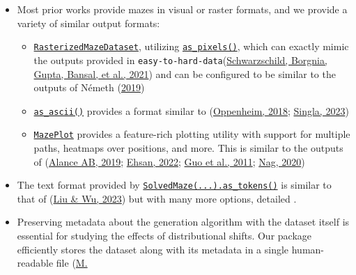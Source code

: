 \documentclass[10pt,a4paper,onecolumn]{article}
\providecommand{\tightlist}{%
  \setlength{\itemsep}{0pt}\setlength{\parskip}{0pt}}
\begin{document}
\begin{itemize}
\item
  Most prior works provide mazes in visual or raster formats, and we
  provide a variety of similar output formats:

  \begin{itemize}
  \tightlist
  \item
    \href{https://understanding-search.github.io/maze-dataset/maze_dataset/dataset/rasterized.html\#RasterizedMazeDataset}{\texttt{RasterizedMazeDataset}},
    utilizing
    \href{https://understanding-search.github.io/maze-dataset/maze_dataset.html\#LatticeMaze.as_pixels}{\texttt{as\_pixels()}},
    which can exactly mimic the outputs provided in
    \texttt{easy-to-hard-data}(\protect\hyperlink{ref-easy_to_hard}{Schwarzschild,
    Borgnia, Gupta, Bansal, et al., 2021}) and can be configured to be
    similar to the outputs of Németh
    (\protect\hyperlink{ref-gh_Nemeth_2019}{2019})
  \item
    \href{https://understanding-search.github.io/maze-dataset/maze_dataset.html\#LatticeMaze.as_ascii}{\texttt{as\_ascii()}}
    provides a format similar to
    (\protect\hyperlink{ref-gh-oppenheimj2018maze}{Oppenheim, 2018};
    \protect\hyperlink{ref-eval-gpt-visual}{Singla, 2023})
  \item
    \href{https://understanding-search.github.io/maze-dataset/maze_dataset/plotting.html\#MazePlot}{\texttt{MazePlot}}
    provides a feature-rich plotting utility with support for multiple
    paths, heatmaps over positions, and more. This is similar to the
    outputs of (\protect\hyperlink{ref-mazegenerator-net}{Alance AB,
    2019}; \protect\hyperlink{ref-gh_Ehsan_2022}{Ehsan, 2022};
    \protect\hyperlink{ref-mathematica-maze}{Guo et al., 2011};
    \protect\hyperlink{ref-mdl-suite}{Nag, 2020})
  \end{itemize}
\item
  The text format provided by
  \href{https://understanding-search.github.io/maze-dataset/maze_dataset.html\#MazeDataset.as_tokens}{\texttt{SolvedMaze(...).as\_tokens()}}
  is similar to that of (\protect\hyperlink{ref-eval-LLM-graphs}{Liu \&
  Wu, 2023}) but with many more options, detailed
  .
\item
  Preserving metadata about the generation algorithm with the dataset
  itself is essential for studying the effects of distributional shifts.
  Our package efficiently stores the dataset along with its metadata in
  a single human-readable file (\protect\hyperlink{ref-zanj}{M.
}
\end{itemize}
\end{document}

